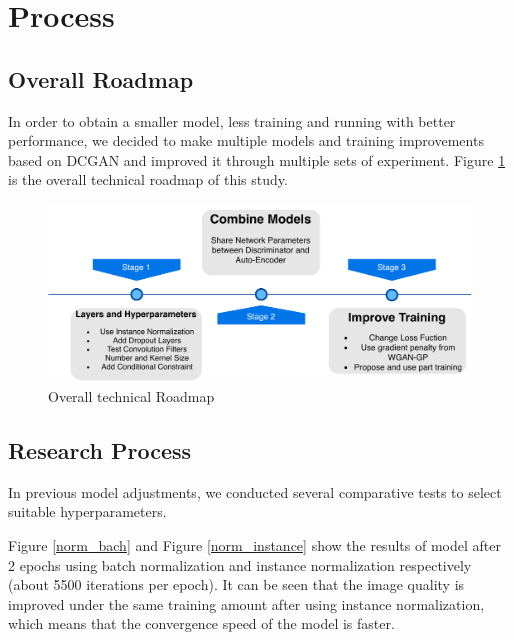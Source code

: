 \section{Process}
\subsection{Overall Roadmap}

In order to obtain a smaller model, less training and running with better performance,
we decided to make multiple models and training improvements based on DCGAN and improved it through multiple sets of experiment.
Figure \ref{roadmap} is the overall technical roadmap of this study.

\begin{figure}
    \begin{center}
    \includegraphics[width=\textwidth]{figures/roadmap.pdf}
    \caption{Overall technical Roadmap}
    \label{roadmap}
    \end{center}
\end{figure}


\subsection{Research Process}

In previous model adjustments, we conducted several comparative tests to select suitable hyperparameters.

Figure \ref{norm_bach} and Figure \ref{norm_instance} show the results of model after 2 epochs using batch normalization and instance normalization respectively (about 5500 iterations per epoch).
It can be seen that the image quality is improved under the same training amount after using instance normalization,
    which means that the convergence speed of the model is faster.

